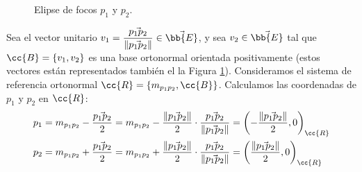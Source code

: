 \begin{ejercicio}
\begin{enumerate}
\begin{figure}[H]
        \caption{Elipse de focos $p_1$ y $p_2$.}  
        \label{fig:ej5.3.6.Elipse}      
    \end{figure}
    Sea el vector unitario $v_1=\dfrac{\vec{p_1p_2}}{\left\|\vec{p_1p_2}\right\|}\in \vec{\bb{E}}$, y sea $v_2\in \vec{\bb{E}}$ tal que $\cc{B}=\{v_1,v_2\}$ es una base ortonormal orientada positivamente (estos vectores están representados también el la Figura \ref{fig:ej5.3.6.Elipse}).
    Consideramos el sistema de referencia ortonormal $\cc{R}=\{m_{p_1p_2},\cc{B}\}$. Calculamos las coordenadas de $p_1$ y $p_2$ en $\cc{R}$:
    \begin{align*}
        p_1 &= m_{p_1p_2} - \frac{\vec{p_1p_2}}{2} = m_{p_1p_2} - \frac{\left\|\vec{p_1p_2}\right\|}{2}\cdot \frac{\vec{p_1p_2}}{\left\|\vec{p_1p_2}\right\|} = \left(-\frac{\left\|\vec{p_1p_2}\right\|}{2}, 0\right)_{\cc{R}} \\
        p_2 &= m_{p_1p_2} + \frac{\vec{p_1p_2}}{2} = m_{p_1p_2} + \frac{\left\|\vec{p_1p_2}\right\|}{2}\cdot \frac{\vec{p_1p_2}}{\left\|\vec{p_1p_2}\right\|} = \left(\frac{\left\|\vec{p_1p_2}\right\|}{2}, 0\right)_{\cc{R}}
    \end{align*}


\end{enumerate}
\end{ejercicio}
